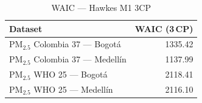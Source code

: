 \begin{table}[htbp]
\centering
\caption{WAIC --- Hawkes M1 3CP}
\label{tab:hawkes_waic_3cp}
\begin{tabular}{lr}
\toprule
Dataset & WAIC (3\,CP) \\
\midrule
PM$_{2.5}$ Colombia 37 --- Bogot\'{a} & 1335.42 \\
PM$_{2.5}$ Colombia 37 --- Medell\'{i}n & 1137.99 \\
PM$_{2.5}$ WHO 25 --- Bogot\'{a} & 2118.41 \\
PM$_{2.5}$ WHO 25 --- Medell\'{i}n & 2116.10 \\
\bottomrule
\end{tabular}
\end{table}
